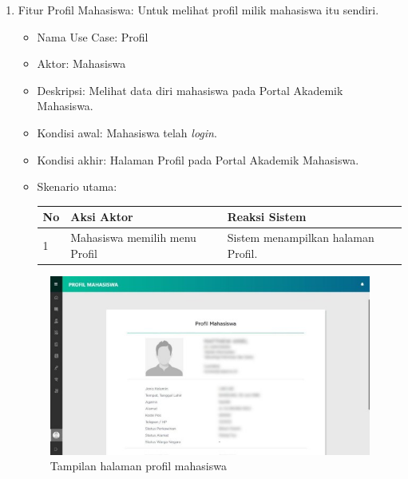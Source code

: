 \begin{enumerate}
	\item Fitur Profil Mahasiswa: Untuk melihat profil milik mahasiswa itu sendiri.
	\begin{itemize}
		\item Nama Use Case: Profil
		\item Aktor: Mahasiswa
		\item Deskripsi: Melihat data diri mahasiswa pada Portal Akademik Mahasiswa.
		\item Kondisi awal: Mahasiswa telah \textit{login}.
		\item Kondisi akhir: Halaman Profil pada Portal Akademik Mahasiswa.
		\item Skenario utama:
		\begin{table}[h!]
			\centering
			\label{}
			\begin{tabular}{ | m{0.5cm} | m{7cm}| m{6cm} | } 
				\hline
				No & Aksi Aktor & Reaksi Sistem \\ 
				\hline
				1 & Mahasiswa memilih menu Profil & Sistem menampilkan halaman Profil.
				\\ 
				\hline
			\end{tabular}
		\end{table}	
	\end{itemize}
	\begin{figure}[H]
		\centering
		\includegraphics[scale=0.7]{Gambar/profil2018.jpg}
		\caption{Tampilan halaman profil mahasiswa} 
		\label{fig:profil_2018}
	\end{figure}


\end{enumerate}
